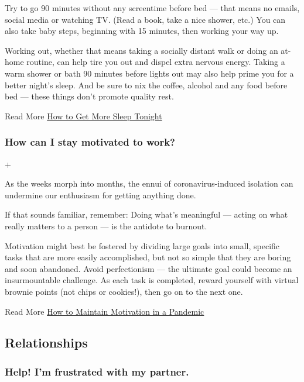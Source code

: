 Try to go 90 minutes without any screentime before bed --- that means no
emails, social media or watching TV. (Read a book, take a nice shower,
etc.) You can also take baby steps, beginning with 15 minutes, then
working your way up.

Working out, whether that means taking a socially distant walk or doing
an at-home routine, can help tire you out and dispel extra nervous
energy. Taking a warm shower or bath 90 minutes before lights out may
also help prime you for a better night's sleep. And be sure to nix the
coffee, alcohol and any food before bed --- these things don't promote
quality rest.

 Read More
\href{https://www.nytimes3xbfgragh.onion/2020/03/25/style/self-care/sleep-tips-benefits-coronavirus.html}{How
to Get More Sleep Tonight}

\hypertarget{how-can-i-stay-motivated-to-work}{%
\subsubsection{How can I stay motivated to
work?}\label{how-can-i-stay-motivated-to-work}}

+

As the weeks morph into months, the ennui of coronavirus-induced
isolation can undermine our enthusiasm for getting anything done.

If that sounds familiar, remember: Doing what's meaningful --- acting on
what really matters to a person --- is the antidote to burnout.

Motivation might best be fostered by dividing large goals into small,
specific tasks that are more easily accomplished, but not so simple that
they are boring and soon abandoned. Avoid perfectionism --- the ultimate
goal could become an insurmountable challenge. As each task is
completed, reward yourself with virtual brownie points (not chips or
cookies!), then go on to the next one.

 Read More
\href{https://www.nytimes3xbfgragh.onion/2020/05/18/well/mind/motivation-pandemic-coronavirus.html}{How
to Maintain Motivation in a Pandemic}

\hypertarget{relationships}{%
\subsection{Relationships}\label{relationships}}

\hypertarget{help-im-frustrated-with-my-partner}{%
\subsubsection{Help! I'm frustrated with my
partner.}\label{help-im-frustrated-with-my-partner}}

